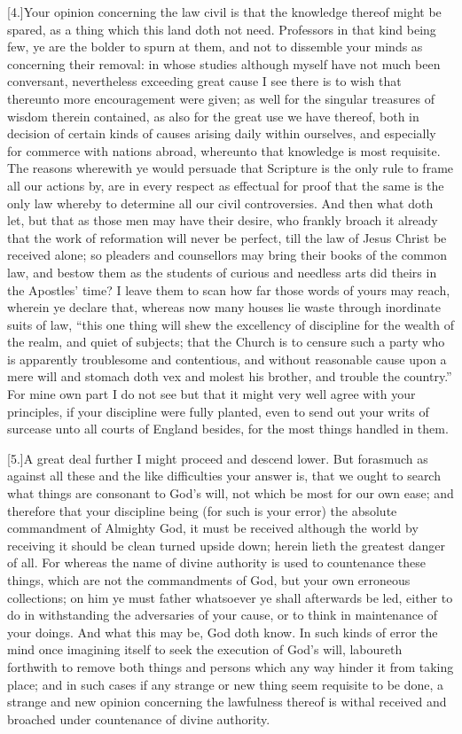[4.]Your opinion concerning the law civil is that the knowledge thereof might be spared, as a thing which this land doth not need. Professors in that kind being few, ye are the bolder to spurn at them, and not to dissemble your minds as concerning their removal: in whose studies although myself have not much been conversant, nevertheless exceeding great cause I see there is to wish that thereunto more encouragement were given; as well for the singular treasures of wisdom therein contained, as also for the great use we have thereof, both in decision of certain kinds of causes arising daily within ourselves, and especially for commerce with nations abroad, whereunto that knowledge is most requisite. The reasons wherewith ye would persuade that Scripture is the only rule to frame all our actions by, are in every respect as effectual for proof that the same is the only law whereby to determine all our civil controversies. And then what doth let, but that as those men may have their desire, who frankly broach it already that the work of reformation will never be perfect, till the law of Jesus Christ be received alone; so pleaders and counsellors may bring their books of the common law, and bestow them as the students of curious and needless arts did theirs in the Apostles’ time? I leave them to scan how far those words of yours may reach, wherein ye declare that, whereas now many houses lie waste through inordinate suits of law, “this one thing will shew the excellency of discipline for the wealth of the realm, and quiet of subjects; that the Church is to censure such a party who is apparently troublesome and contentious, and without reasonable cause upon a mere will and stomach doth vex and molest his brother, and trouble the country.” For mine own part I do not see but that it might very well agree with your principles, if your discipline were fully planted, even to send out your writs of surcease unto all courts of England besides, for the most things handled in them.

[5.]A great deal further I might proceed and descend lower. But forasmuch as against all these and the like difficulties your answer is, that we ought to search what things are consonant to God’s will, not which be most for our own ease; and therefore that your discipline being (for such is your error) the absolute commandment of Almighty God, it must be received although the world by receiving it should be clean turned upside down; herein lieth the greatest danger of all. For whereas the name of divine authority is used to countenance these things, which are not the commandments of God, but your own erroneous collections; on him ye must father whatsoever ye shall afterwards be led, either to do in withstanding the adversaries of your cause, or to think in maintenance of your doings. And what this may be, God doth know. In such kinds of error the mind once imagining itself to seek the execution of God’s will, laboureth forthwith to remove both things and persons which any way hinder it from taking place; and in such cases if any strange or new thing seem requisite to be done, a strange and new opinion concerning the lawfulness thereof is withal received and broached under countenance of divine authority.

